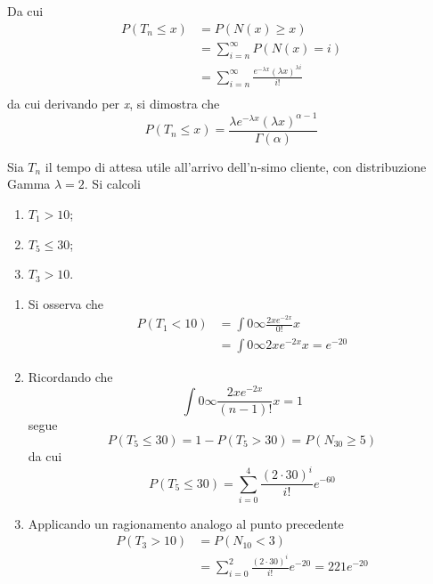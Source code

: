 \documentclass{subfiles}
\begin{document}
Da cui
\[\begin{aligned}
        P(T_{n} \le x) & = P(N(x) \ge x)                                                                   \\
                       & = \sum\limits_{i = n}^{\infty}{P(N(x) = i)}                                       \\
                       & = \sum\limits_{i = n}^{\infty}{\frac{e^{-\lambda x} (\lambda x)^{\lambda i}}{i!}} \\
    \end{aligned}\]
da cui derivando per \emph{x}, si dimostra che
\[
    P(T_{n} \le x) = \frac{\lambda e^{-\lambda x} (\lambda x)^{\alpha - 1}}{\Gamma(\alpha)}
\]
\clearpage
\begin{Example*}
    Sia \(T_{n}\) il tempo di attesa utile all'arrivo dell'n-simo cliente, con distribuzione Gamma \(\lambda = 2\).
    Si calcoli
    \begin{enumerate}
        \item \(T_{1} > 10\);
        \item \(T_{5} \le 30\);
        \item \(T_{3} > 10\).
    \end{enumerate}

    \begin{enumerate}
        \item Si osserva che
              \[\begin{aligned}
                      P(T_{1} < 10) & = \int{0}{\infty}{\frac{2x e^{-2x}}{0!}}{x} \\
                                    & = \int{0}{\infty}{2x e^{-2x}}{x} = e^{-20}
                  \end{aligned}\]

        \item Ricordando che
              \[
                  \int{0}{\infty}{\frac{2x e^{-2x}}{(n - 1)!}}{x} = 1
              \]
              segue
              \[
                  P(T_{5} \le 30) = 1 - P(T_{5} > 30) = P(N_{30} \ge 5)
              \]
              da cui
              \[
                  P(T_{5} \le 30) = \sum\limits_{i = 0}^{4} \frac{(2 \cdot 30)^{i}}{i!}e^{-60}
              \]

        \item Applicando un ragionamento analogo al punto precedente
              \[\begin{aligned}
                      P(T_{3} > 10) & = P(N_{10} < 3)                                                             \\
                                    & = \sum\limits_{i = 0}^{2}{\frac{(2 \cdot 30)^{i}}{i!} e^{-20}} = 221e^{-20}
                  \end{aligned}\]
    \end{enumerate}
\end{Example*}
\clearpage
\end{document}
